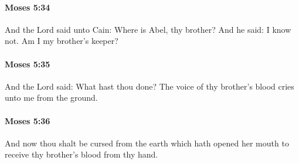 		\paragraph{Moses 5:34} %
			\label{MOSES-5-34}

			And the Lord said unto Cain: Where is Abel, thy brother? And he said: I know not. Am I my brother's keeper?


		\paragraph{Moses 5:35} %
			\label{MOSES-5-35}

			And the Lord said: What hast thou done? The voice of thy brother's blood cries unto me from the ground.


		\paragraph{Moses 5:36} %
			\label{MOSES-5-36}

			And now thou shalt be cursed from the earth which hath opened her mouth to receive thy brother's blood from thy hand.


